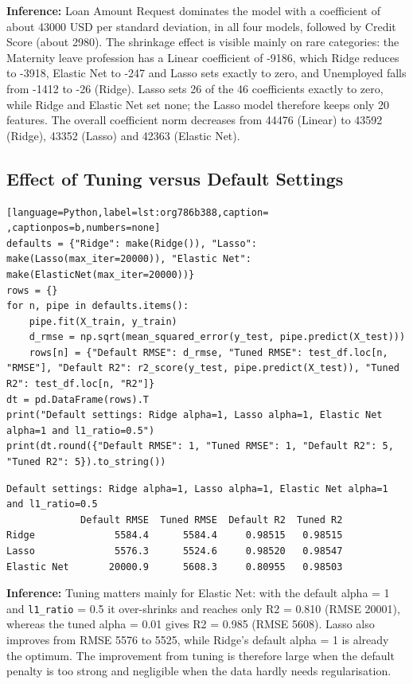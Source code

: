 \documentclass[11pt]{article}
\begin{document}
\textbf{Inference:} Loan Amount Request dominates the model with a coefficient of about 43000 USD per standard
deviation, in all four models, followed by Credit Score (about 2980). The shrinkage effect
is visible mainly on rare categories: the Maternity leave profession has a Linear
coefficient of -9186, which Ridge reduces to -3918, Elastic Net to -247 and Lasso sets
exactly to zero, and Unemployed falls from -1412 to -26 (Ridge). Lasso sets 26 of the 46
coefficients exactly to zero, while Ridge and Elastic Net set none; the Lasso model
therefore keeps only 20 features. The overall coefficient norm decreases from 44476 (Linear)
to 43592 (Ridge), 43352 (Lasso) and 42363 (Elastic Net).

\subsection*{Effect of Tuning versus Default Settings}
\label{sec:org2b5cc00}

\begin{lstlisting}[language=Python,label=lst:org786b388,caption= ,captionpos=b,numbers=none]
defaults = {"Ridge": make(Ridge()), "Lasso": make(Lasso(max_iter=20000)), "Elastic Net": make(ElasticNet(max_iter=20000))}
rows = {}
for n, pipe in defaults.items():
    pipe.fit(X_train, y_train)
    d_rmse = np.sqrt(mean_squared_error(y_test, pipe.predict(X_test)))
    rows[n] = {"Default RMSE": d_rmse, "Tuned RMSE": test_df.loc[n, "RMSE"], "Default R2": r2_score(y_test, pipe.predict(X_test)), "Tuned R2": test_df.loc[n, "R2"]}
dt = pd.DataFrame(rows).T
print("Default settings: Ridge alpha=1, Lasso alpha=1, Elastic Net alpha=1 and l1_ratio=0.5")
print(dt.round({"Default RMSE": 1, "Tuned RMSE": 1, "Default R2": 5, "Tuned R2": 5}).to_string())
\end{lstlisting}

\begin{verbatim}
Default settings: Ridge alpha=1, Lasso alpha=1, Elastic Net alpha=1 and l1_ratio=0.5
             Default RMSE  Tuned RMSE  Default R2  Tuned R2
Ridge              5584.4      5584.4     0.98515   0.98515
Lasso              5576.3      5524.6     0.98520   0.98547
Elastic Net       20000.9      5608.3     0.80955   0.98503
\end{verbatim}


\textbf{Inference:} Tuning matters mainly for Elastic Net: with the default alpha = 1 and \texttt{l1\_ratio} = 0.5 it
over-shrinks and reaches only R2 = 0.810 (RMSE 20001), whereas the tuned alpha = 0.01 gives
R2 = 0.985 (RMSE 5608). Lasso also improves from RMSE 5576 to 5525, while Ridge's default
alpha = 1 is already the optimum. The improvement from tuning is therefore large when the
default penalty is too strong and negligible when the data hardly needs regularisation.
\end{document}
